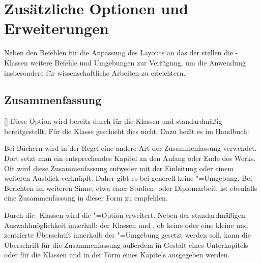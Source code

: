 \section{Zusätzliche Optionen und Erweiterungen}
Neben den Befehlen für die Anpassung des Layouts an das \CD der \TnUD stellen 
die \TUDScript-Klassen weitere Befehle und Umgebungen zur Verfügung, um die 
Anwendung insbesondere für wissenschaftliche Arbeiten zu erleichtern.


\subsection{Zusammenfassung}
\begin{Declaration}{[\PSet]}%
\printdeclarationlist%
%
%
%
Diese Option wird bereits durch \KOMAScript{} für die Klassen  
und  standardmäßig bereitgestellt. Für die Klasse 
 geschieht dies nicht. Dazu heißt es im Handbuch:
%
\begin{quoting}
Bei Büchern wird in der Regel eine andere Art der Zusammenfassung verwendet. 
Dort setzt man ein entsprechendes Kapitel an den Anfang oder Ende des Werks. 
Oft wird diese Zusammenfassung entweder mit der Einleitung oder einem weiteren 
Ausblick verknüpft. Daher gibt es bei  generell keine 
"=Umgebung. Bei Berichten im weiteren Sinne, etwa einer 
Studien- oder Diplomarbeit, ist ebenfalls eine Zusammenfassung in dieser Form 
zu empfehlen.
\end{quoting}
%
Durch die \TUDScript-Klassen wird die "=Option erweitert. 
Neben der standardmäßigen Auswahlmöglichkeit innerhalb der Klassen 
 und , ob keine oder eine kleine und 
zentrierte Überschrift innerhalb der "=Umgebung gesetzt 
werden soll, kann die Überschrift für die Zusammenfassung außerdem in Gestalt 
eines Unterkapitels oder für die Klassen  und 
 in der Form eines Kapitels ausgegeben werden.


\end{Declaration}

